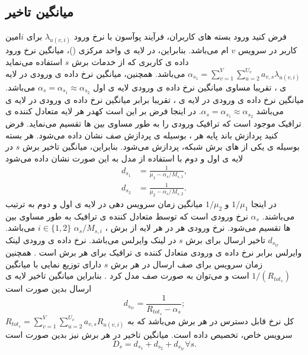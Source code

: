 \subsection{میانگین تاخیر}
فرض کنید ورود بسته های کاربران، فرآیند پوآسون با نرخ ورود 
$\lambda_{u(v,i)}$
برای $i$امین کاربر در سرویس $v$ ام می‌باشد.
بنابراین، در لایه ی واحد مرکزی ()، میانگین نرخ ورود داده ی کاربری که از خدمات برش $s$ استفاده می‌نماید 
$\alpha_{s_1} = \sum_{v=1}^{V}\sum_{u=2}^{U_v}a_{v,s}\lambda_{u(v,i)}$
می‌باشد. 
همچنین، میانگین نرخ داده ی ورودی در لایه ی ، تقریبا مساوی میانگین نرخ داده ی ورودی لایه ی اول 
$\alpha_{s} =\alpha_{s_1} \approx \alpha_{s_2}$
می‌باشد.
میانگین نرخ داده ی ورودی در لایه ی ، تقریبا برابر میانگین نرخ داده ی ورودی در لایه ی  می‌باشد $\alpha_{s} =\alpha_{s_1} \approx \alpha_{s_2}$.
در اینجا فرض بر این است کهدر هر لایه متعادل کننده ی ترافیک موجود است که ترافیک ورودی را به طور مساوی بین  ها تقسیم می‌نماید\cite{frdl,luong2018novel,luong2018novel1}.
فرض کنید پردازش باند پایه هر ، بوسیله ی پردازش صف  نشان داده می‌شود.
هر بسته بوسیله ی یکی از های برش شبکه، پردازش می‌شود.
بنابراین، میانگین تاخیر برش $s$ در لایه ی اول و دوم با استفاده از مدل  به این صورت نشان داده می‌شود
\begin{equation}
\begin{split}
d_{s_1} &= \frac{1}{\mu_1 - \alpha_{s}/{M_{s,1}}},\\
d_{s_2} &= \frac{1}{\mu_2 - \alpha_{s}/{M_{s,2}}}.
\end{split}
\end{equation}
در اینجا
$1/\mu_1$ و $1/\mu_2$
میانگین زمان سرویس دهی در لایه ی اول و دوم به ترتیب می‌باشند.
$\alpha_{s}$
نرخ ورودی است که توسط متعادل کننده ی ترافیک به طور مساوی بین  ها تقسیم می‌شود.
نرخ ورودی هر  در هر لایه از برش ، $\alpha_{s}/{M_{s,i}}$ $ i \in \{1,2\}$ می‌باشد.
$d_{s_{tr}}$
تاخیر ارسال برای برش $s$ در لینک وایرلس می‌باشد.
نرخ داده ی ورودی لینک وایرلس برابر نرخ داده ی ورودی متعادل کننده ی ترافیک برای هر برش است
\cite{frdl}.
همچنین زمان سرویس برای صف ارسال در هر برش $s$ دارای توزیع نمایی با میانگین $1/(R_{{tot}_s})$
است و می‌توان به صورت صف  مدل کرد  
\cite{frdl,luong2018novel,luong2018novel1,guo2016exploiting}.
بنابراین میانگین تاخیر لایه ی ارسال بدین صورت است
\begin{equation}
 d_{s_{tr}} = \frac{1}{R_{{tot}_s} - \alpha_{s}};
\end{equation}
 $R_{{tot}_s} =  \sum_{v=1}^{V}\sum_{u=2}^{U_v}a_{v,s}R_{u(v,i)}$ 
 کل نرخ قابل دسترس در هر برش می‌باشد که به سرویس خاص، تخصیص داده است.
میانگین تاخیر در هر برش نیز بدین صورت است
\begin{equation}
D_{s} = d_{s_1} + d_{s_2} + d_{s_{tr}} \forall s.
\end{equation}
